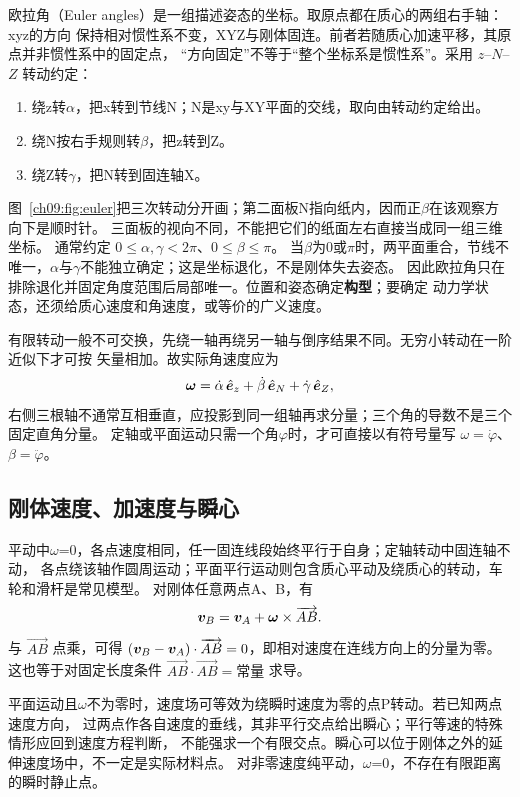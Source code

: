 {欧拉角（Euler angles）是一组描述姿态的坐标。取原点都在质心的两组右手轴：xyz的方向
保持相对惯性系不变，XYZ与刚体固连。前者若随质心加速平移，其原点并非惯性系中的固定点，
“方向固定”不等于“整个坐标系是惯性系”。采用 $z$--$N$--$Z$ 转动约定：
\begin{enumerate}[label=(\arabic*),leftmargin=2.4em]
 \item 绕z转$\alpha$，把x转到节线N；N是xy与XY平面的交线，取向由转动约定给出。
 \item 绕N按右手规则转$\beta$，把z转到Z。
 \item 绕Z转$\gamma$，把N转到固连轴X。
\end{enumerate}
图~\ref{ch09:fig:euler}把三次转动分开画；第二面板N指向纸内，因而正$\beta$在该观察方向下是顺时针。
三面板的视向不同，不能把它们的纸面左右直接当成同一组三维坐标。
\eulerDiagram
通常约定 $0\le\alpha,\gamma<2\pi$、$0\le\beta\le\pi$。
当$\beta$为0或$\pi$时，两平面重合，节线不唯一，$\alpha$与$\gamma$不能独立确定；这是坐标退化，不是刚体失去姿态。
因此欧拉角只在排除退化并固定角度范围后局部唯一。位置和姿态确定\textbf{构型}；要确定
动力学状态，还须给质心速度和角速度，或等价的广义速度。

有限转动一般不可交换，先绕一轴再绕另一轴与倒序结果不同。无穷小转动在一阶近似下才可按
矢量相加。故实际角速度应为
\begin{equation}
 \vect\omega=\dot\alpha\,\uvec e_z+\dot\beta\,\uvec e_N+\dot\gamma\,\uvec e_Z,
\end{equation}
右侧三根轴不通常互相垂直，应投影到同一组轴再求分量；三个角的导数不是三个固定直角分量。
定轴或平面运动只需一个角$\varphi$时，才可直接以有符号量写 $\omega=\dot\varphi$、$\beta=\ddot\varphi$。

\subsection{刚体速度、加速度与瞬心}
平动中$\omega$=0，各点速度相同，任一固连线段始终平行于自身；定轴转动中固连轴不动，
各点绕该轴作圆周运动；平面平行运动则包含质心平动及绕质心的转动，车轮和滑杆是常见模型。
对刚体任意两点A、B，有
\begin{equation}
 \vect v_B=\vect v_A+\vect\omega\times\overrightarrow{AB}.\label{ch09:eq:rigid-velocity}
\end{equation}
与 $\overrightarrow{AB}$ 点乘，可得
$(\vect v_B-\vect v_A)\cdot\overrightarrow{AB}=0$，即相对速度在连线方向上的分量为零。
这也等于对固定长度条件 $\overrightarrow{AB}\cdot\overrightarrow{AB}=\text{常量}$ 求导。

平面运动且$\omega$不为零时，速度场可等效为绕瞬时速度为零的点P转动。若已知两点速度方向，
过两点作各自速度的垂线，其非平行交点给出瞬心；平行等速的特殊情形应回到速度方程判断，
不能强求一个有限交点。瞬心可以位于刚体之外的延伸速度场中，不一定是实际材料点。
对非零速度纯平动，$\omega$=0，不存在有限距离的瞬时静止点。

}
